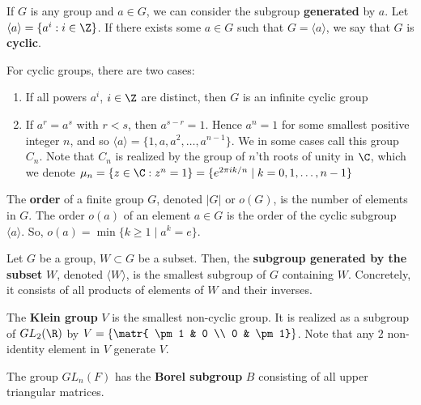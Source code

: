 \begin{defn}
    If $G$ is any group and $a \in G$, we can consider the subgroup \textbf{generated} by $a$. Let $\langle a \rangle = \{a^i : i \in \Z  \}$. If there exists some $a \in G$ such that $G = \langle a \rangle$, we say that $G$ is \textbf{cyclic}.
\end{defn}

\begin{ex}
    For cyclic groups, there are two cases:
    \begin{enumerate}
        \item If all powers $a^i$, $i \in \Z$ are distinct, then $G$ is an infinite cyclic group
        \item If $a^r=a^s$ with $r<s$, then $a^{s-r}=1$. Hence $a^n = 1$ for some smallest positive integer $n$, and so $\langle a \rangle = \{1,a,a^2,\dots,a^{n-1}\}$. We in some cases call this group $C_n$. Note that $C_n$ is realized by the group of $n$'th roots of unity in $\C$, which we denote $\mu_n = \{z \in \C: z^n=1\} = \{e^{2\pi i k/n} \mid k=0,1,\dots,n-1\}$
    \end{enumerate}
\end{ex}

\begin{defn}
    The \textbf{order} of a finite group $G$, denoted $|G|$ or $o(G)$, is the number of elements in $G$. The order $o(a)$ of an element $a \in G$ is the order of the cyclic subgroup $\langle a \rangle$. So, $o(a) = \min \{k \geq 1 \mid a^k=e\}$.
\end{defn}

\begin{defn}
    Let $G$ be a group, $W \subset G$ be a subset. Then, the \textbf{subgroup generated by the subset} $W$, denoted $\langle W \rangle$, is the smallest subgroup of $G$ containing $W$. Concretely, it consists of all products of elements of $W$ and their inverses.
\end{defn}

\begin{defn}
    The \textbf{Klein group} $V$ is the smallest non-cyclic group. It is realized as a subgroup of $GL_2(\R)$ by $V=\left \{ \matr{ \pm1 & 0 \\ 0 & \pm 1} \right \}$. Note that any $2$ non-identity element in $V$ generate $V$.
\end{defn}

\begin{defn}
    The group $GL_n(F)$ has the \textbf{Borel subgroup} $B$ consisting of all upper triangular matrices.
\end{defn}

